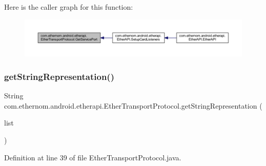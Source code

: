 Here is the caller graph for this function\+:\nopagebreak
\begin{figure}[H]
\begin{center}
\leavevmode
\includegraphics[width=350pt]{classcom_1_1ethernom_1_1android_1_1etherapi_1_1_ether_transport_protocol_ae590c234c12d110212fd75595235a132_icgraph}
\end{center}
\end{figure}
\mbox{\label{classcom_1_1ethernom_1_1android_1_1etherapi_1_1_ether_transport_protocol_aee2f3cf832c15ccf711a83a8269224d9}} 
\subsubsection{\texorpdfstring{get\+String\+Representation()}{getStringRepresentation()}}
{\footnotesize\ttfamily String com.\+ethernom.\+android.\+etherapi.\+Ether\+Transport\+Protocol.\+get\+String\+Representation (\begin{DoxyParamCaption}\item[{Array\+List$<$ Character $>$}]{list }\end{DoxyParamCaption})\hspace{0.3cm}{\ttfamily [package]}}



Definition at line 39 of file Ether\+Transport\+Protocol.\+java.

